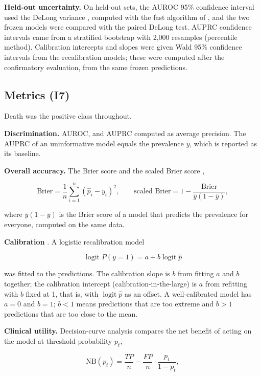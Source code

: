 \textbf{Held-out uncertainty.} On held-out sets, the AUROC 95\% confidence
interval used the DeLong variance \parencite{delong1988}, computed with the fast
algorithm of \textcite{sun2014}, and the two frozen models were compared with
the paired DeLong test. AUPRC confidence intervals came from a stratified
bootstrap with 2,000 resamples (percentile method). Calibration intercepts and
slopes were given Wald 95\% confidence intervals from the recalibration models;
these were computed after the confirmatory evaluation, from the same frozen
predictions.

\hypertarget{metrics-i7}{%
\subsection{Metrics (I7)}\label{metrics-i7}}

Death was the positive class throughout.

\textbf{Discrimination.} AUROC, and AUPRC computed as average precision. The
AUPRC of an uninformative model equals the prevalence \(\bar y\), which is
reported as its baseline.

\textbf{Overall accuracy.} The Brier score and the scaled Brier score
\parencite{steyerberg2010},

\[\text{Brier} = \frac{1}{n}\sum_{i=1}^{n} (\hat p_i - y_i)^2, \qquad \text{scaled Brier} = 1 - \frac{\text{Brier}}{\bar y(1 - \bar y)},\]

where \(\bar y(1 - \bar y)\) is the Brier score of a model that predicts the
prevalence for everyone, computed on the same data.

\textbf{Calibration} \parencite{vancalster2019}. A logistic recalibration model

\[\operatorname{logit} P(y = 1) = a + b \operatorname{logit}\hat p\]

was fitted to the predictions. The calibration slope is \(b\) from fitting \(a\)
and \(b\) together; the calibration intercept (calibration-in-the-large) is
\(a\) from refitting with \(b\) fixed at 1, that is, with
\(\operatorname{logit}\hat p\) as an offset. A well-calibrated model has
\(a = 0\) and \(b = 1\); \(b < 1\) means predictions that are too extreme and
\(b > 1\) predictions that are too close to the mean.

\textbf{Clinical utility.} Decision-curve analysis \parencite{vickers2006}
compares the net benefit of acting on the model at threshold probability
\(p_t\),

\[\text{NB}(p_t) = \frac{TP}{n} - \frac{FP}{n}\cdot\frac{p_t}{1 - p_t},\]

